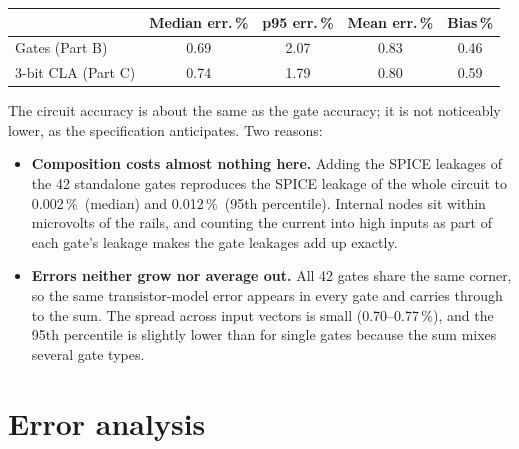 \documentclass[10pt]{article}
\newcommand{\pct}{\,\%}
\begin{document}
\begin{table}[H]
\centering
\begin{tabular}{@{}lcccc@{}}
\toprule
 & Median err.\,\% & p95 err.\,\% & Mean err.\,\% & Bias\,\% \\
\midrule
Gates (Part B) & 0.69 & 2.07 & 0.83 & 0.46 \\
3-bit CLA (Part C) & 0.74 & 1.79 & 0.80 & 0.59 \\
\bottomrule
\end{tabular}
\end{table}

The circuit accuracy is about the same as the gate accuracy; it is not noticeably lower, as the
specification anticipates. Two reasons:
\begin{itemize}
\item \textbf{Composition costs almost nothing here.} Adding the SPICE leakages of the 42
standalone gates reproduces the SPICE leakage of the whole circuit to 0.002\pct\ (median) and
0.012\pct\ (95th percentile). Internal nodes sit within microvolts of the rails, and counting the
current into high inputs as part of each gate's leakage makes the gate leakages add up exactly.
\item \textbf{Errors neither grow nor average out.} All 42 gates share the same corner, so the same
transistor-model error appears in every gate and carries through to the sum. The spread across
input vectors is small (0.70--0.77\pct), and the 95th percentile is slightly lower than for single
gates because the sum mixes several gate types.
\end{itemize}

\section{Error analysis}
\end{document}
